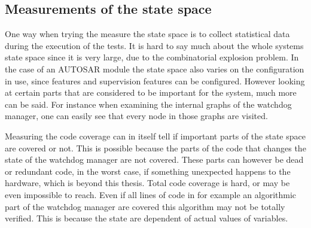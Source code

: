 \subsection{Measurements of the state space}
One way when trying the measure the state space is to collect
statistical data during the execution of the tests. It is hard to say
much about the whole systems state space since it is very large, due
to the combinatorial explosion problem. In the case of an AUTOSAR module the
state space also varies on the configuration in use, since features
and supervision features can be configured.  However looking at
certain parts that are considered to be important for the system, much
more can be said. For instance when examining the internal graphs of
the watchdog manager, one can easily see that every node in those
graphs are visited.

Measuring the code coverage can in itself tell if important parts of
the state space are covered or not. This is possible because the parts
of the code that changes the state of the watchdog manager are not
covered. These parts can however be dead or redundant code, in the
worst case, if something unexpected happens to the hardware, which is
beyond this thesis. Total code coverage is hard, or may be even
impossible to reach.  Even if all lines of code in for example an
algorithmic part of the watchdog manager are covered this algorithm
may not be totally verified. This is because the state are dependent
of actual values of variables.

